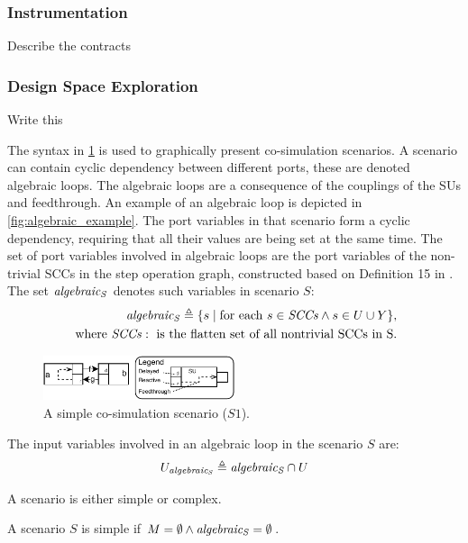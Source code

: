 \subsubsection{Instrumentation}
Describe the contracts

\subsubsection{Design Space Exploration}
Write this


The syntax in \cref{fig:simpleexample} is used to graphically present co-simulation scenarios.
A scenario can contain cyclic dependency between different ports, these are denoted algebraic loops.
The algebraic loops are a consequence of the couplings of the SUs and feedthrough. 
An example of an algebraic loop is depicted in \cref{fig:algebraic_example}.
The port variables in that scenario form a cyclic dependency, requiring that all their values are being set at the same time. 
The set of port variables involved in algebraic loops are the port variables of the non-trivial SCCs in the step operation graph, constructed based on Definition 15 in \cite{Gomes2019c}.
The set $\mathit{algebraic_{S}}$ denotes such variables in scenario $S$:
\begin{align*}
  \mathit{algebraic_{S}} \triangleq \{s \mid \text{for each\ } s \in \mathit{SCCs} \land s \in U \cup Y\}, \\
  \text{ where } \mathit{SCCs}: \text{ is the flatten set of all nontrivial SCCs in S}.
\end{align*}
\vspace{-0.5em}

\begin{figure}
  \includegraphics[width=0.5\textwidth]{images/simple_example.pdf}
  \caption{A simple co-simulation scenario ($S1$).}
  \label{fig:simpleexample}  
\end{figure}

The input variables involved in an algebraic loop in the scenario $S$ are:
\begin{align}
  U_{\mathit{algebraic_{S}}} \triangleq \mathit{algebraic_{S}} \cap U
\end{align}

A scenario is either simple or complex.
\begin{definition}\label{def:simpleScenario}
  A scenario $S$ is simple if $M = \emptyset \land \mathit{algebraic_{S}} = \emptyset$.
\end{definition}

